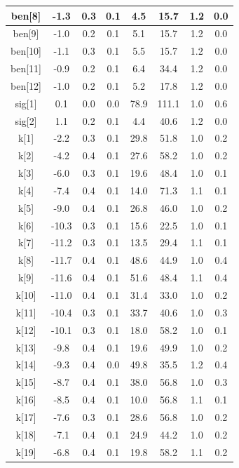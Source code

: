 \begin{longtable}{|c|c|c|c|c|c|c|c|}
\hline
ben[8] & -1.3 & 0.3 & 0.1 & 4.5 & 15.7 & 1.2 & 0.0 \\
\hline
ben[9] & -1.0 & 0.2 & 0.1 & 5.1 & 15.7 & 1.2 & 0.0 \\
\hline
ben[10] & -1.1 & 0.3 & 0.1 & 5.5 & 15.7 & 1.2 & 0.0 \\
\hline
ben[11] & -0.9 & 0.2 & 0.1 & 6.4 & 34.4 & 1.2 & 0.0 \\
\hline
ben[12] & -1.0 & 0.2 & 0.1 & 5.2 & 17.8 & 1.2 & 0.0 \\
\hline
sig[1] & 0.1 & 0.0 & 0.0 & 78.9 & 111.1 & 1.0 & 0.6 \\
\hline
sig[2] & 1.1 & 0.2 & 0.1 & 4.4 & 40.6 & 1.2 & 0.0 \\
\hline
k[1] & -2.2 & 0.3 & 0.1 & 29.8 & 51.8 & 1.0 & 0.2 \\
\hline
k[2] & -4.2 & 0.4 & 0.1 & 27.6 & 58.2 & 1.0 & 0.2 \\
\hline
k[3] & -6.0 & 0.3 & 0.1 & 19.6 & 48.4 & 1.0 & 0.1 \\
\hline
k[4] & -7.4 & 0.4 & 0.1 & 14.0 & 71.3 & 1.1 & 0.1 \\
\hline
k[5] & -9.0 & 0.4 & 0.1 & 26.8 & 46.0 & 1.0 & 0.2 \\
\hline
k[6] & -10.3 & 0.3 & 0.1 & 15.6 & 22.5 & 1.0 & 0.1 \\
\hline
k[7] & -11.2 & 0.3 & 0.1 & 13.5 & 29.4 & 1.1 & 0.1 \\
\hline
k[8] & -11.7 & 0.4 & 0.1 & 48.6 & 44.9 & 1.0 & 0.4 \\
\hline
k[9] & -11.6 & 0.4 & 0.1 & 51.6 & 48.4 & 1.1 & 0.4 \\
\hline
k[10] & -11.0 & 0.4 & 0.1 & 31.4 & 33.0 & 1.0 & 0.2 \\
\hline
k[11] & -10.4 & 0.3 & 0.1 & 33.7 & 40.6 & 1.0 & 0.3 \\
\hline
k[12] & -10.1 & 0.3 & 0.1 & 18.0 & 58.2 & 1.0 & 0.1 \\
\hline
k[13] & -9.8 & 0.4 & 0.1 & 19.6 & 49.9 & 1.0 & 0.2 \\
\hline
k[14] & -9.3 & 0.4 & 0.0 & 49.8 & 35.5 & 1.2 & 0.4 \\
\hline
k[15] & -8.7 & 0.4 & 0.1 & 38.0 & 56.8 & 1.0 & 0.3 \\
\hline
k[16] & -8.5 & 0.4 & 0.1 & 10.0 & 56.8 & 1.1 & 0.1 \\
\hline
k[17] & -7.6 & 0.3 & 0.1 & 28.6 & 56.8 & 1.0 & 0.2 \\
\hline
k[18] & -7.1 & 0.4 & 0.1 & 24.9 & 44.2 & 1.0 & 0.2 \\
\hline
k[19] & -6.8 & 0.4 & 0.1 & 19.8 & 58.2 & 1.1 & 0.2 \\

\end{longtable}
